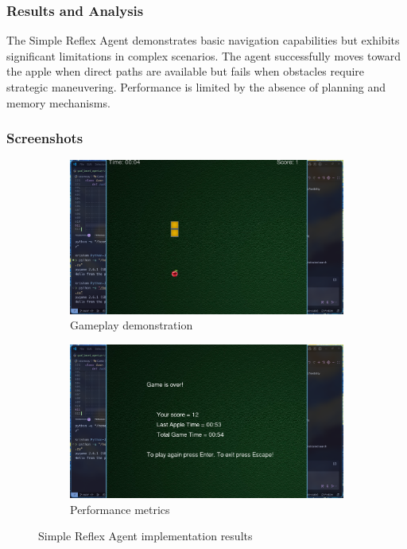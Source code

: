 \documentclass[11pt,a4paper]{article}
\begin{document}
\subsubsection{Results and Analysis}
The Simple Reflex Agent demonstrates basic navigation capabilities but exhibits significant limitations in complex scenarios. The agent successfully moves toward the apple when direct paths are available but fails when obstacles require strategic maneuvering. Performance is limited by the absence of planning and memory mechanisms.

\subsubsection{Screenshots}
\begin{figure}[H]
    \centering
    \begin{subfigure}{0.45\textwidth}
        \includegraphics[width=\textwidth]{ss/simple_play.png}
        \caption{Gameplay demonstration}
    \end{subfigure}
    \hfill
    \begin{subfigure}{0.45\textwidth}
        \includegraphics[width=\textwidth]{ss/simple_score.png}
        \caption{Performance metrics}
    \end{subfigure}
    \caption{Simple Reflex Agent implementation results}
\end{figure}
\end{document}

